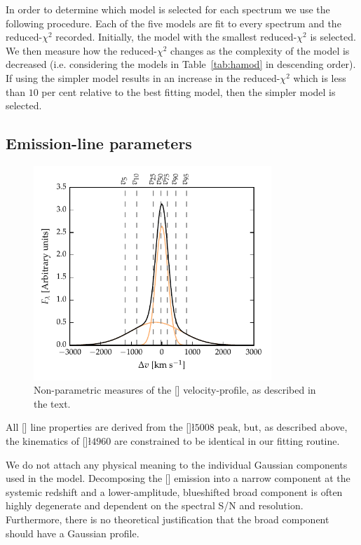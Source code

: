 In order to determine which model is selected for each spectrum we use the following procedure.  
Each of the five models are fit to every spectrum and the reduced-$\chi^2$ recorded.
Initially, the model with the smallest reduced-$\chi^2$ is selected. 
We then measure how the reduced-$\chi^2$ changes as the complexity of the model is decreased (i.e. considering the models in Table~\ref{tab:hamod} in descending order). 
If using the simpler model results in an increase in the reduced-$\chi^2$ which is less than $10$ per cent relative to the best fitting model, then the simpler model is selected.  

\subsection{Emission-line parameters}

\begin{figure}[t!]
    \centering
    \includegraphics[width=0.8\textwidth]{figures/chapter04/example_oiii.pdf} 
    \caption[{Non-parametric measures of the [] velocity-profile.}]{Non-parametric measures of the [] velocity-profile, as described in the text.}     
    \label{fig:example_oiii}
\end{figure}

All [] line properties are derived from the []\l$5008$ peak, but, as described above, the kinematics of []\l$4960$ are constrained to be identical in our fitting routine. 

We do not attach any physical meaning to the individual Gaussian components used in the model. 
Decomposing the [] emission into a narrow component at the systemic redshift and a lower-amplitude, blueshifted broad component is often highly degenerate and dependent on the spectral S/N and resolution. 
Furthermore, there is no theoretical justification that the broad component should have a Gaussian profile.  

